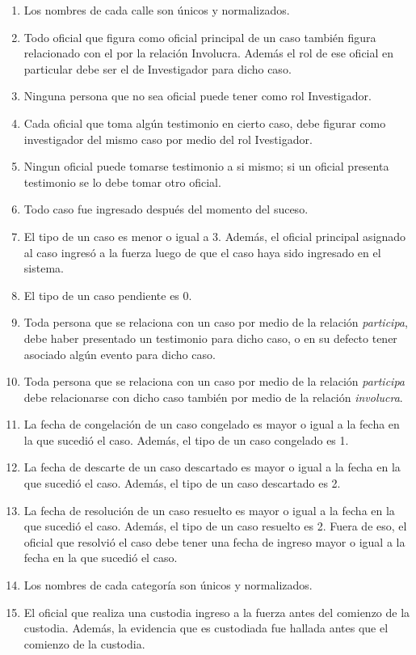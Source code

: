 \documentclass{article}
\theoremstyle{definition}
\theoremstyle{remark}
\begin{document}
\begin{enumerate}
    \item Los nombres de cada calle son únicos y normalizados.
    \item Todo oficial que figura como oficial principal de un caso también figura relacionado con el por la relación Involucra. Además el rol de ese oficial en particular debe ser el de Investigador para dicho caso.
    \item Ninguna persona que no sea oficial puede tener como rol Investigador.
    \item Cada oficial que toma algún testimonio en cierto caso, debe figurar como investigador del mismo caso por medio del rol Ivestigador.
    \item Ningun oficial puede tomarse testimonio a si mismo; si un oficial presenta testimonio se lo debe tomar otro oficial.
    \item Todo caso fue ingresado después del momento del suceso.
    \item El tipo de un caso es menor o igual a 3. Además, el oficial principal asignado al caso ingresó a la fuerza luego de que el caso haya sido ingresado en el sistema.
    \item El tipo de un caso pendiente es 0.
    \item Toda persona que se relaciona con un caso por medio de la relación \textit{participa}, debe haber presentado un testimonio para dicho caso, o en su defecto tener asociado algún evento para dicho caso.
    \item Toda persona que se relaciona con un caso por medio de la relación \textit{participa} debe relacionarse con dicho caso también por medio de la relación \textit{involucra}.
    \item La fecha de congelación de un caso congelado es mayor o igual a la fecha en la que sucedió el caso. Además, el tipo de un caso congelado es 1.
    \item La fecha de descarte de un caso descartado es mayor o igual a la fecha en la que sucedió el caso. Además, el tipo de un caso descartado es 2.
    \item La fecha de resolución de un caso resuelto es mayor o igual a la fecha en la que sucedió el caso. Además, el tipo de un caso resuelto es 2. Fuera de eso, el oficial que resolvió el caso debe tener una fecha de ingreso mayor o igual a la fecha en la que sucedió el caso.
    \item Los nombres de cada categoría son únicos y normalizados.
    \item El oficial que realiza una custodia ingreso a la fuerza antes del comienzo de la custodia. Además, la evidencia que es custodiada fue hallada antes que el comienzo de la custodia.

\end{enumerate}
\end{document}
